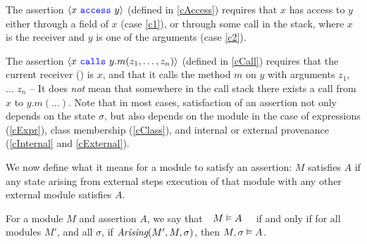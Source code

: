  
The assertion ${\langle x\ {\color{blue}\texttt{access}}\ y \rangle}$ (defined in  \ref{cAccess})
requires  that $x$ has access to $y$
either through a field of $x$ (case \ref{c1}),
or through some call in the stack, where $x$ is the receiver and $y$ is one of the
arguments (case \ref{c2}).
 
 The assertion %
 ${\langle x\ {\color{blue}\texttt{calls}}\ y.m(z_1, \ldots, z_n) \rangle}$  (defined in \ref{cCall}) 
requires that the current receiver () is $x$, and that it calls the method $m$ on $y$ with
 arguments $z_1$, ... $z_n$ -- It does \emph{not} mean  that somewhere in the 
 call stack there exists a call from $x$ to $y.m(...)$. 
 Note that in most cases, satisfaction of an assertion not only depends on the state $\sigma$, but 
also depends on the module in the case of expressions (\ref{cExpr}), class membership
(\ref{cClass}), and internal or external provenance (\ref{cInternal} and \ref{cExternal}).


We now define what it means for a module to satisfy an assertion:
 $M$ satisfies  $A$ if any state arising from external steps execution of that
module with any other external module  satisfies $A$. 
 
\begin{definition}  
\label{def:mdl-sat}
For a module $M$ and assertion $A$, we say that\ \  $M \vDash A$ \ \ if and only if 
for all modules $M'$, and all $\sigma$, if $\textit{Arising}(M', M, \sigma)$, then $M , \sigma \vDash A$.
\end{definition}

